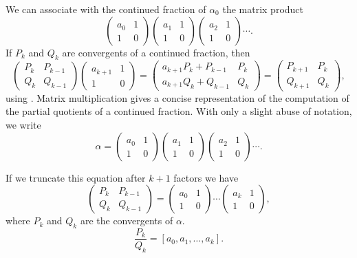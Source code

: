 We can associate with the continued fraction of $\alpha_0$ the
matrix product 
\[
\begin{pmatrix} a_0 & 1 \\ 1 & 0 \end{pmatrix} \begin{pmatrix}a_1&1\\1&0\end{pmatrix} 
  \begin{pmatrix}a_2&1\\1&0\end{pmatrix} \cdots.
\]
If $P_k$ and $Q_k$ are convergents of a continued fraction, then
\[
\begin{pmatrix}P_k&P_{k-1}\\ Q_k&Q_{k-1}\end{pmatrix} \begin{pmatrix}a_{k+1}&1\\1&0\end{pmatrix}
  = \begin{pmatrix}a_{k+1}P_k+P_{k-1}& P_k\\ a_{k+1}Q_k+Q_{k-1}& Q_k\end{pmatrix}
  = \begin{pmatrix}P_{k+1}&P_k\\ Q_{k+1}&Q_k\end{pmatrix},
\]
using .  Matrix multiplication gives a concise
representation of the computation of the partial quotients of a
continued fraction.  With only a slight abuse of notation, we write
\[
\alpha = 
  \begin{pmatrix}a_0&1\\1&0\end{pmatrix} \begin{pmatrix}a_1&1\\1&0\end{pmatrix} 
  \begin{pmatrix}a_2&1\\1&0\end{pmatrix} \cdots.
\]

If we truncate this equation after $k+1$ factors we have
\begin{equation} \label{CFMatrixIdentity:Eq}
  \begin{pmatrix}P_k&P_{k-1}\\ Q_k&Q_{k-1}\end{pmatrix} =
  \begin{pmatrix}a_0&1\\1&0\end{pmatrix} \cdots
  \begin{pmatrix}a_k&1\\1&0\end{pmatrix},
\end{equation}
where $P_k$ and $Q_k$ are the convergents of $\alpha$.
\[
\frac{P_k}{Q_k} = [a_0, a_1, \ldots, a_k].
\]

